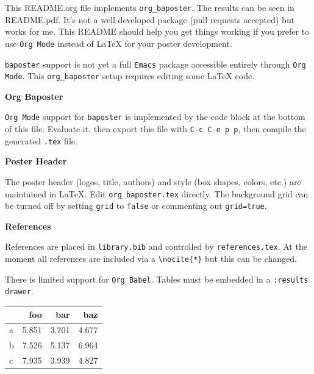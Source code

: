 
  {
This README.org file implements \texttt{org\_baposter}. The results can be seen in README.pdf. It's not a well-developed package (pull requests accepted) but works for me. This README should help you get things working if you prefer to use \texttt{Org Mode} instead of \LaTeX{} for your poster development.

\texttt{baposter} support is not yet a full \texttt{Emacs} package accessible entirely through \texttt{Org Mode}. This \texttt{org\_baposter} setup requires editing some \LaTeX{} code.

\textbf{Org Baposter}

\texttt{Org Mode} support for \texttt{baposter} is implemented by the code block at the bottom of this file. Evaluate it, then export this file with \texttt{C-c C-e p p}, then compile the generated \texttt{.tex} file.

\textbf{Poster Header}

The poster header (logos, title, authors) and style (box shapes, colors, etc.) are maintained in \LaTeX{}. Edit \texttt{org\_baposter.tex} directly. The background grid can be turned off by setting \texttt{grid} to \texttt{false} or commenting out \texttt{grid=true}.

\textbf{References}

References are placed in \texttt{library.bib} and controlled by \texttt{references.tex}. At the moment all references are included via a \texttt{\textbackslash{}nocite\{*\}} but this can be changed.

}
  {
There is limited support for \texttt{Org Babel}. Tables must be embedded in a \texttt{:results drawer}.

\label{}
\begin{center}
\begin{tabular}{lrrr}
 & foo & bar & baz\\
\hline
a & 5.851 & 3.701 & 4.677\\
b & 7.526 & 5.137 & 6.964\\
c & 7.935 & 3.939 & 4.827\\
\end{tabular}
\end{center}

}
